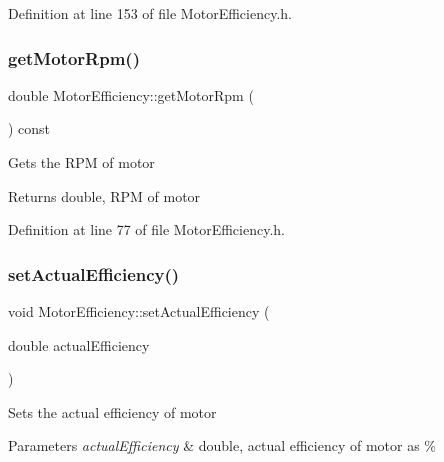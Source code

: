 Definition at line 153 of file Motor\+Efficiency.\+h.

\mbox{\label{class_motor_efficiency_ab29655f487e90a73246be6e9bc67c36a}} 
\subsubsection{\texorpdfstring{get\+Motor\+Rpm()}{getMotorRpm()}}
{\footnotesize\ttfamily double Motor\+Efficiency\+::get\+Motor\+Rpm (\begin{DoxyParamCaption}{ }\end{DoxyParamCaption}) const\hspace{0.3cm}{\ttfamily [inline]}}

Gets the R\+PM of motor

\begin{DoxyReturn}{Returns}
double, R\+PM of motor 
\end{DoxyReturn}


Definition at line 77 of file Motor\+Efficiency.\+h.

\mbox{\label{class_motor_efficiency_a7a5ad8d01fdc0a3bf93d952752487496}} 
\subsubsection{\texorpdfstring{set\+Actual\+Efficiency()}{setActualEfficiency()}}
{\footnotesize\ttfamily void Motor\+Efficiency\+::set\+Actual\+Efficiency (\begin{DoxyParamCaption}\item[{double}]{actual\+Efficiency }\end{DoxyParamCaption})\hspace{0.3cm}{\ttfamily [inline]}}

Sets the actual efficiency of motor


\begin{DoxyParams}{Parameters}
{\em actual\+Efficiency} & double, actual efficiency of motor as \% \\
\hline
\end{DoxyParams}



